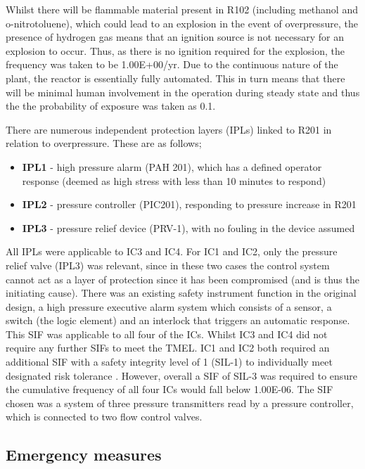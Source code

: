 Whilst there will be flammable material present in R102 (including methanol and o-nitrotoluene), which could lead to an explosion in the event of overpressure, the presence of hydrogen gas means that an ignition source is not necessary for an explosion to occur. Thus, as there is no ignition required for the explosion, the frequency was taken to be 1.00E+00/yr. Due to the continuous nature of the plant, the reactor is essentially fully automated. This in turn means that there will be minimal human involvement in the operation during steady state and thus the the probability of exposure was taken as 0.1. 

There are numerous  independent protection layers (IPLs) linked to R201 in relation to overpressure. These are as follows;
 
 \begin{itemize}
\item \textbf{IPL1} - high pressure alarm (PAH 201), which has a defined operator response (deemed as high stress with less than 10 minutes to respond)
\item  \textbf{IPL2} - pressure controller (PIC201), responding to pressure increase in R201
\item  \textbf{IPL3} - pressure relief device (PRV-1), with no fouling in the device assumed
 \end{itemize}

All IPLs were applicable to IC3 and IC4. For IC1 and IC2, only the pressure relief valve (IPL3) was relevant, since in these two cases the control system cannot act  as a layer of protection since it has been compromised (and is thus the initiating cause). There was an existing safety instrument function in the original design, a high pressure executive alarm system which consists of a sensor, a switch (the logic element) and an interlock that triggers an automatic response. This SIF was applicable to all four of the ICs. Whilst IC3 and IC4 did not require any further SIFs to meet the TMEL. IC1 and IC2 both required an additional SIF with a safety integrity level of 1 (SIL-1) to individually meet designated risk tolerance . However, overall a SIF of SIL-3 was required to ensure the cumulative frequency of all four ICs would fall below 1.00E-06. The SIF chosen was a system of three pressure transmitters read by a pressure controller, which is connected to two flow control valves. 


\subsection{Emergency measures }

